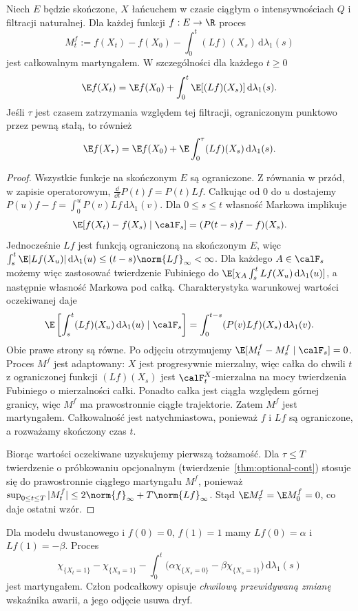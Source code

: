 \begin{twierdzenie}
\label{thm:dynkin}
Niech $E$ będzie skończone, $X$ łańcuchem w czasie
ciągłym o intensywnościach $Q$ i filtracji naturalnej.
Dla każdej funkcji $f:E\to\R$ proces
\[
M_t^f:=f(X_t)-f(X_0)-\int_0^t (Lf)(X_s)\,\mathrm d\lambda_1(s)
\]
jest całkowalnym martyngałem.
W szczególności dla każdego $t\ge0$
\[
\E f(X_t)=\E f(X_0)+
\int_0^t\E[(Lf)(X_s)]\,\mathrm d\lambda_1(s).
\]
Jeśli $\tau$ jest czasem zatrzymania względem tej filtracji,
ograniczonym punktowo przez pewną stałą,
to również
\[
\E f(X_\tau)=\E f(X_0)+
\E\int_0^\tau (Lf)(X_s)\,\mathrm d\lambda_1(s).
\]
\end{twierdzenie}
\begin{proof}
Wszystkie funkcje na skończonym $E$ są ograniczone.
Z równania w przód, w zapisie operatorowym,
$\frac{\dd}{\dd t}P(t)f=P(t)Lf$.
Całkując od $0$ do $u$ dostajemy
$P(u)f-f=\int_0^u P(v)Lf\,\mathrm d\lambda_1(v)$.
Dla $0\le s\le t$ własność Markowa implikuje
\[
\E[f(X_t)-f(X_s)\mid\calF_s]
=(P(t-s)f-f)(X_s).
\]
Jednocześnie $Lf$ jest funkcją ograniczoną na skończonym $E$, więc
$\int_s^t\E|Lf(X_u)|\,\mathrm d\lambda_1(u)\le(t-s)\norm{Lf}_\infty<\infty$.
Dla każdego $A\in\calF_s$ możemy więc zastosować twierdzenie
Fubiniego do $\E[\chi_A\int_s^t Lf(X_u)\,\mathrm d\lambda_1(u)]$,
a następnie własność Markowa pod całką. Charakterystyka
warunkowej wartości oczekiwanej daje
\[
\E\left[\int_s^t(Lf)(X_u)\,\mathrm d\lambda_1(u)\mid\calF_s\right]
=\int_0^{t-s}(P(v)Lf)(X_s)\,\mathrm d\lambda_1(v).
\]
Obie prawe strony są równe. Po odjęciu otrzymujemy
$\E[M_t^f-M_s^f\mid\calF_s]=0$.
Proces $M^f$ jest adaptowany: $X$ jest progresywnie
mierzalny, więc całka do chwili $t$ z ograniczonej
funkcji $(Lf)(X_s)$ jest $\calF_t^X$-mierzalna
na mocy twierdzenia Fubiniego o mierzalności całki.
Ponadto całka jest ciągła względem górnej granicy,
więc $M^f$ ma prawostronnie ciągłe trajektorie.
Zatem $M^f$ jest martyngałem. Całkowalność jest
natychmiastowa, ponieważ $f$ i $Lf$ są ograniczone,
a rozważamy skończony czas $t$.

Biorąc wartości oczekiwane uzyskujemy pierwszą tożsamość.
Dla $\tau\le T$ twierdzenie o próbkowaniu opcjonalnym
(twierdzenie~\ref{thm:optional-cont}) stosuje się do
prawostronnie ciągłego martyngału $M^f$, ponieważ
$\sup_{0\le t\le T}|M_t^f|\le2\norm{f}_\infty+T\norm{Lf}_\infty$.
Stąd $\E M_\tau^f=\E M_0^f=0$, co daje ostatni wzór.
\end{proof}

\begin{przyklad}
Dla modelu dwustanowego i $f(0)=0$, $f(1)=1$ mamy
$Lf(0)=\alpha$ i $Lf(1)=-\beta$.
Proces
\[
\chi_{\{X_t=1\}}-\chi_{\{X_0=1\}}
-\int_0^t\bigl(\alpha\chi_{\{X_s=0\}}
-\beta\chi_{\{X_s=1\}}\bigr)\,\mathrm d\lambda_1(s)
\]
jest martyngałem. Człon podcałkowy opisuje
\emph{chwilową przewidywaną zmianę} wskaźnika awarii,
a jego odjęcie usuwa dryf.
\end{przyklad}

